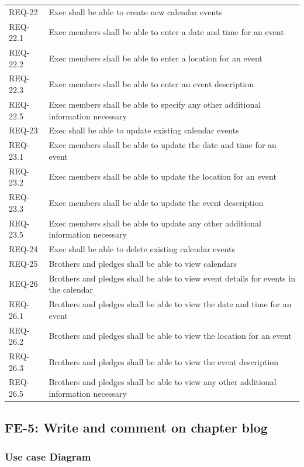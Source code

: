 \documentclass{article}
\newcommand{\req}[1]{REQ-{#1}}
\begin{document}
\begin{tabular}{lp{8cm}}
\req{22} & Exec shall be able to create new calendar events \\
\req{22.1} & Exec members shall be able to enter a date and time for an
event\\
\req{22.2} & Exec members shall be able to enter a location for an
event\\
\req{22.3} & Exec members shall be able to enter an event description
\\
\req{22.5} & Exec members shall be able to specify any other additional
information necessary \\
\req{23} & Exec shall be able to update existing calendar events \\
\req{23.1} & Exec members shall be able to update the date and time for an
event\\
\req{23.2} & Exec members shall be able to update the location for an
event\\
\req{23.3} & Exec members shall be able to update the event description
\\
\req{23.5} & Exec members shall be able to update any other additional
information necessary \\
\req{24} & Exec shall be able to delete existing calendar events \\
\req{25} & Brothers and pledges shall be able to view calendars \\
\req{26} & Brothers and pledges shall be able to view event details
for events in the calendar\\
\req{26.1} & Brothers and pledges shall be able to view the date and time for an
event\\
\req{26.2} & Brothers and pledges shall be able to view the location for an
event\\
\req{26.3} & Brothers and pledges shall be able to view the event description
\\
\req{26.5} & Brothers and pledges shall be able to view any other additional
information necessary \\
\end{tabular}

\subsection{FE-5: Write and comment on chapter blog}

\subsubsection{Use case Diagram}
\end{document}
